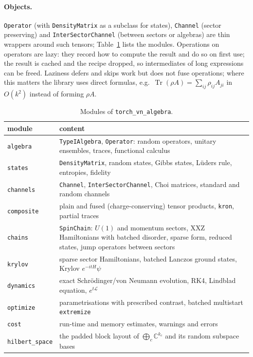 \documentclass[11pt]{article}
\DeclareMathOperator{\Tr}{Tr}
\newcommand{\C}{\mathbb{C}}
\begin{document}
\paragraph{Objects.} \texttt{Operator} (with \texttt{DensityMatrix} as a subclass for states),
\texttt{Channel} (sector preserving) and \texttt{InterSectorChannel} (between sectors or algebras) are
thin wrappers around such tensors; Table~\ref{tab:modules} lists the modules. Operations on operators
are lazy: they record how to compute the result and do so on first use; the result is cached and the
recipe dropped, so intermediates of long expressions can be freed. Laziness defers and skips work but
does not fuse operations; where this matters the library uses direct formulas, e.g.\
$\Tr(\rho A)=\sum_{ij}\rho_{ij}A_{ji}$ in $O(k^2)$ instead of forming $\rho A$.

\begin{table}[h]
\centering\small
\begin{tabular}{lp{}}
\toprule
module & content \\
\midrule
\texttt{algebra} & \texttt{TypeIAlgebra}, \texttt{Operator}: random operators, unitary ensembles, traces,
functional calculus\\
\texttt{states} & \texttt{DensityMatrix}, random states, Gibbs states, Lüders rule, entropies, fidelity\\
\texttt{channels} & \texttt{Channel}, \texttt{InterSectorChannel}, Choi matrices, standard and random channels\\
\texttt{composite} & plain and fused (charge-conserving) tensor products, \texttt{kron}, partial traces\\
\texttt{chains} & \texttt{SpinChain}: $U(1)$ and momentum sectors, XXZ Hamiltonians with batched disorder,
sparse form, reduced states, jump operators between sectors\\
\texttt{krylov} & sparse sector Hamiltonians, batched Lanczos ground states, Krylov $e^{-itH}\psi$\\
\texttt{dynamics} & exact Schrödinger/von Neumann evolution, RK4, Lindblad equation, $e^{t\mathcal L}$\\
\texttt{optimize} & parametrisations with prescribed contrast, batched multistart \texttt{extremize}\\
\texttt{cost} & run-time and memory estimates, warnings and errors\\
\texttt{hilbert\_space} & the padded block layout of $\bigoplus_c\C^{k_c}$ and its random subspace bases\\
\bottomrule
\end{tabular}
\caption{Modules of \texttt{torch\_vn\_algebra}.}
\label{tab:modules}
\end{table}
\end{document}
